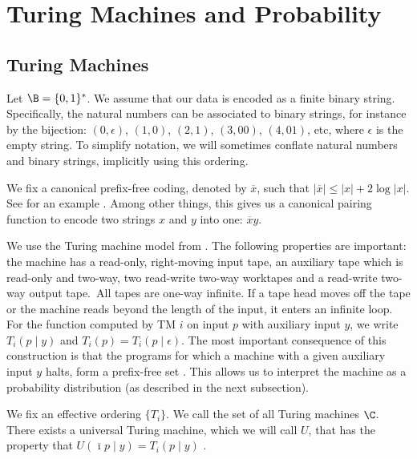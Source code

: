 \section{Turing Machines and Probability}

\subsection*{Turing Machines}

Let $\B= \{0, 1\}^*$. We assume that our data is encoded as a finite binary string. Specifically, the natural numbers can be associated to binary strings, for instance by the bijection: $(0, \epsilon)$, $(1, 0)$, $(2, 1)$, $(3, 00)$, $(4, 01)$, etc, where $\epsilon$ is the empty string. To simplify notation, we will sometimes conflate natural numbers and binary strings, implicitly using this ordering.

We fix a canonical prefix-free coding, denoted by $\overline{x}$, such that $|\overline{x}| \leq |x| + 2 \log{|x|}$. See \cite[Example~1.11.13]{DBLP:books/daglib/0087328} for an example . Among other things, this gives us a canonical pairing function to encode two strings $x$ and $y$ into one: $\overline{x}y$.

\noindent We use the Turing machine model from \cite[Example~3.1.1]{DBLP:books/daglib/0087328}. The following properties are important: the machine has a read-only, right-moving input tape, an auxiliary tape which is read-only and two-way, two read-write two-way worktapes and a read-write two-way output tape.\footnotemark~All tapes are one-way infinite. If a tape head moves off the tape or the machine reads beyond the length of the input, it enters an infinite loop. For the function computed by TM $i$ on input $p$ with auxiliary input $y$, we write $T_i(p\mid y)$ and $T_i(p) = T_i(p \mid \epsilon)$. The most important consequence of this construction is that the programs for which a machine with a given auxiliary input $y$ halts, form a prefix-free set \cite[Example~3.1.1]{DBLP:books/daglib/0087328}. This allows us to interpret the machine as a probability distribution (as described in the next subsection).


We fix an effective ordering $\{T_i\}$. We call the set of all Turing machines $\C$. There exists a universal Turing machine, which we will call $U$, that has the property that $U(\overline{\imath}p\mid y) = T_i(p\mid y)$ \cite[Theorem~3.1.1]{DBLP:books/daglib/0087328}. 

